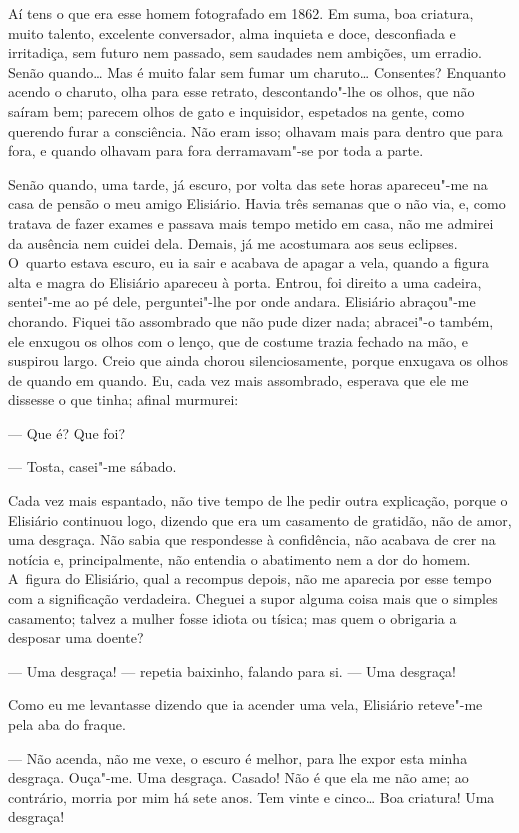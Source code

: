 \begin{linenumbers}
Aí tens o que era esse homem fotografado em 1862. Em suma, boa criatura,
muito talento, excelente conversador, alma inquieta e doce, desconfiada
e irritadiça, sem futuro nem passado, sem saudades nem ambições, um
erradio. Senão quando\ldots{} Mas é muito falar sem fumar um charuto\ldots{}
Consentes? Enquanto acendo o charuto, olha para esse retrato,
descontando"-lhe os olhos, que não saíram bem; parecem olhos de gato e
inquisidor, espetados na gente, como querendo furar a consciência. Não
eram isso; olhavam mais para dentro que para fora, e quando olhavam para
fora derramavam"-se por toda a parte.

Senão quando, uma tarde, já escuro, por volta das sete horas apareceu"-me
na casa de pensão o meu amigo Elisiário. Havia três semanas que o não
via, e, como tratava de fazer exames e passava mais tempo metido em
casa, não me admirei da ausência nem cuidei dela. Demais, já me
acostumara aos seus eclipses. O~quarto estava escuro, eu ia sair e
acabava de apagar a vela, quando a figura alta e magra do Elisiário
apareceu à porta. Entrou, foi direito a uma cadeira, sentei"-me ao pé
dele, perguntei"-lhe por onde andara. Elisiário abraçou"-me chorando.
Fiquei tão assombrado que não pude dizer nada; abracei"-o também, ele
enxugou os olhos com o lenço, que de costume trazia fechado na mão, e
suspirou largo. Creio que ainda chorou silenciosamente, porque enxugava
os olhos de quando em quando. Eu, cada vez mais assombrado, esperava que
ele me dissesse o que tinha; afinal murmurei:

--- Que é? Que foi? 

--- Tosta, casei"-me sábado.

Cada vez mais espantado, não tive tempo de lhe pedir outra explicação,
porque o Elisiário continuou logo, dizendo que era um casamento de
gratidão, não de amor, uma desgraça. Não sabia que respondesse à
confidência, não acabava de crer na notícia e, principalmente, não
entendia o abatimento nem a dor do homem. A~figura do Elisiário, qual a
recompus depois, não me aparecia por esse tempo com a significação
verdadeira. Cheguei a supor alguma coisa mais que o simples casamento;
talvez a mulher fosse idiota ou tísica; mas quem o obrigaria a desposar
uma doente?

--- Uma desgraça! --- repetia baixinho, falando para si. --- Uma desgraça!

Como eu me levantasse dizendo que ia acender uma vela, Elisiário
reteve"-me pela aba do fraque.

--- Não acenda, não me vexe, o escuro é melhor, para lhe expor esta minha
desgraça. Ouça"-me. Uma desgraça. Casado! Não é que ela me não ame; ao
contrário, morria por mim há sete anos. Tem vinte e cinco\ldots{} Boa
criatura! Uma desgraça!


\end{linenumbers}
